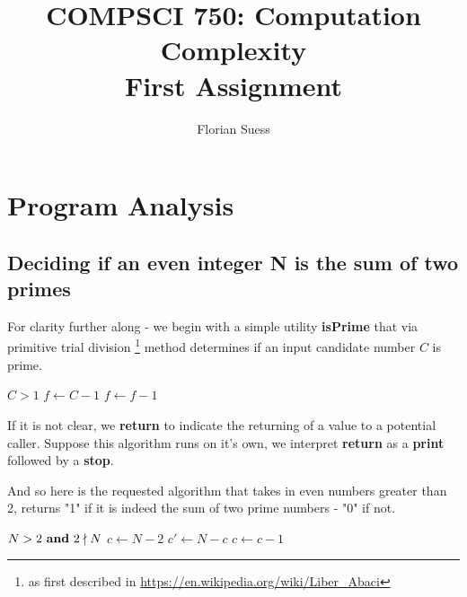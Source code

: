 \documentclass{article}
\title{COMPSCI 750: Computation Complexity \\ First Assignment}
\author{Florian Suess}
\begin{document}
\maketitle
\section{Program Analysis}
\subsection{Deciding if an even integer N is the sum of two primes}
For clarity further along - we begin with a simple utility \textbf{isPrime} that via primitive trial division \footnote{as first described in \url{https://en.wikipedia.org/wiki/Liber_Abaci}} method determines if an input candidate number $C$ is prime.

\vspace{1em}
\begin{algorithmic}[1]
	\REQUIRE $C > 1$
	\ENDIF
	\STATE $f \leftarrow C - 1$
		\ENDIF
		\STATE $f \leftarrow f - 1$
	\ENDWHILE
\end{algorithmic}
\vspace{1em}

If it is not clear, we \textbf{return} to indicate the returning of a value to a potential caller. Suppose this algorithm runs on it's own, we interpret \textbf{return} as a \textbf{print} followed by a \textbf{stop}.

\pagebreak

And so here is the requested algorithm that takes in even numbers greater than 2, returns "1" if it is indeed the sum of two prime numbers - "0" if not.

\vspace{1em}
\begin{algorithmic}[1]
	\REQUIRE $N > 2 \text{ \textbf{and} } 2 \nmid N$
	\STATE $c \leftarrow N - 2$
			\STATE $c' \leftarrow N - c$
			\ENDIF
		\ENDIF
		\STATE $c \leftarrow c - 1$
	\ENDWHILE
\end{algorithmic}
\vspace{1em}
\end{document}
